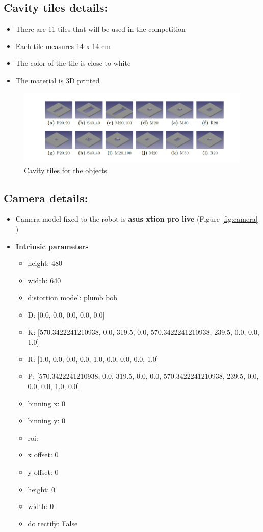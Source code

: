 \documentclass{article}
\begin{document}
\subsection{Cavity tiles details:}
\begin{itemize}
\item There are 11 tiles that will be used in the competition
\item Each tile measures 14 x 14 cm 
\item The color of the tile is close to white
\item The material is 3D printed
\end{itemize}
\begin{figure}[h!]
\centering
\includegraphics[scale=1.0]{images/AllTiles.png}
\caption{Cavity tiles for the objects}
\label{fig:tiles}
\end{figure}


\subsection{Camera details:}
\begin{itemize}
\item Camera model fixed to the robot is \textbf{asus xtion pro live} (Figure \ref{fig:camera} )
\item \textbf{Intrinsic parameters}




\begin{itemize}
\item height: 480
\item width: 640
\item distortion model: plumb bob
\item D: [0.0, 0.0, 0.0, 0.0, 0.0]
\item K: [570.3422241210938, 0.0, 319.5, 0.0, 570.3422241210938, 239.5, 0.0, 0.0, 1.0]
\item R: [1.0, 0.0, 0.0, 0.0, 1.0, 0.0, 0.0, 0.0, 1.0]
\item P: [570.3422241210938, 0.0, 319.5, 0.0, 0.0, 570.3422241210938, 239.5, 0.0, 0.0, 0.0, 1.0, 0.0]
\item binning x: 0
\item binning y: 0
\item roi:
\item x offset: 0
\item y offset: 0
\item height: 0
\item width: 0
\item do rectify: False
\end{itemize} 
\end{itemize}
\end{document}
